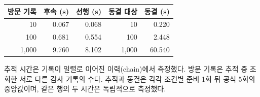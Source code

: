 \begin{center}
\begin{minipage}{\columnwidth}
\centering\small\captionsetup{hypcap=false}
\label{tab:eval-trace}
\begin{tabular*}{\columnwidth}{@{\extracolsep{\fill}}rrrrr@{}}
\toprule
방문 기록 & 후속 (s) & 선행 (s) & 동결 대상 & 동결 (s) \\ \midrule
10 & 0.067 & 0.068 & 10 & 0.220 \\
100 & 0.681 & 0.554 & 100 & 2.448 \\
1,000 & 9.760 & 8.102 & 1,000 & 60.540 \\
\bottomrule
\end{tabular*}
\par\smallskip\begin{minipage}{\columnwidth}\footnotesize 추적 시간은 기록이 일렬로 이어진 이력(chain)에서 측정했다. 방문 기록은 추적 중 조회한 서로 다른 감사 기록의 수다. 추적과 동결은 각각 조건별 준비 1회 뒤 공식 5회의 중앙값이며, 같은 행의 두 시간은 독립적으로 측정했다.\end{minipage}
\end{minipage}
\end{center}
